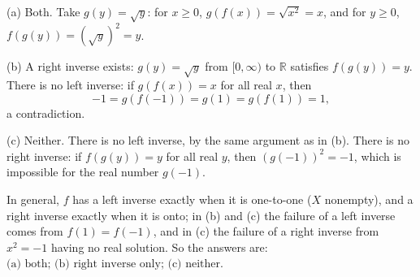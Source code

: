 (a) Both. Take $g(y)=\sqrt y$: for $x\ge0$, $g(f(x))=\sqrt{x^2}=x$, and for $y\ge0$, $f(g(y))=\left(\sqrt y\right)^2=y$.

(b) A right inverse exists: $g(y)=\sqrt y$ from $[0,\infty)$ to $\mathbb R$ satisfies $f(g(y))=y$. There is no left inverse: if $g(f(x))=x$ for all real $x$, then
\[
-1=g(f(-1))=g(1)=g(f(1))=1,
\]
a contradiction.

(c) Neither. There is no left inverse, by the same argument as in (b). There is no right inverse: if $f(g(y))=y$ for all real $y$, then $(g(-1))^2=-1$, which is impossible for the real number $g(-1)$.

In general, $f$ has a left inverse exactly when it is one-to-one ($X$ nonempty), and a right inverse exactly when it is onto; in (b) and (c) the failure of a left inverse comes from $f(1)=f(-1)$, and in (c) the failure of a right inverse from $x^2=-1$ having no real solution. So the answers are: $\boxed{\text{(a) both; (b) right inverse only; (c) neither}}$.
